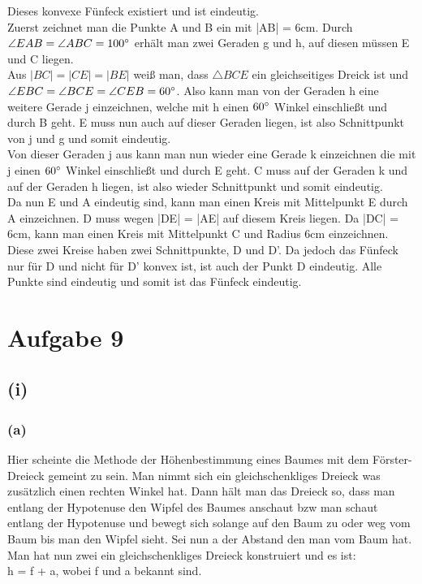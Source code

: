 \documentclass[12pt,a4paper]{article}
\begin{document}
\noindent Dieses konvexe Fünfeck existiert und ist eindeutig.\\
 Zuerst zeichnet man die Punkte A und B ein mit |AB| = 6cm. Durch $\angle EAB = \angle ABC = 100\degree$ erhält man zwei Geraden g und h, auf diesen müssen E und C liegen.\\
Aus $|BC| = |CE| = |BE|$ weiß man, dass $\triangle BCE$ ein gleichseitiges Dreick ist und $\angle EBC = \angle BCE = \angle CEB = 60\degree$. Also kann man von der Geraden h eine weitere Gerade j einzeichnen, welche mit h einen $60\degree$ Winkel einschließt und durch B geht. E muss nun auch auf dieser Geraden liegen, ist also Schnittpunkt von j und g und somit eindeutig. \\
Von dieser Geraden j aus kann man nun wieder eine Gerade k einzeichnen die mit j einen $60\degree$ Winkel einschließt und durch E geht. C muss auf der Geraden k und auf der Geraden h liegen, ist also wieder Schnittpunkt und somit eindeutig.\\
Da nun E und A eindeutig sind, kann man einen Kreis mit Mittelpunkt E durch A einzeichnen. D muss wegen |DE| = |AE| auf diesem Kreis liegen. Da |DC| = 6cm, kann man einen Kreis mit Mittelpunkt C und Radius 6cm einzeichnen. Diese zwei Kreise haben zwei Schnittpunkte, D und D'. Da jedoch das Fünfeck nur für D und nicht für D' konvex ist, ist auch der Punkt D eindeutig. Alle Punkte sind eindeutig und somit ist das Fünfeck eindeutig.\\

\newpage
\section*{Aufgabe 9}
\subsection*{(i)}
\subsubsection*{(a)}
Hier scheinte die Methode der Höhenbestimmung eines Baumes mit dem Förster-Dreieck gemeint zu sein. Man nimmt sich ein gleichschenkliges Dreieck was zusätzlich einen rechten Winkel hat. Dann hält man das Dreieck so, dass man entlang der Hypotenuse den Wipfel des Baumes anschaut bzw man schaut entlang der Hypotenuse und bewegt sich solange auf den Baum zu oder weg vom Baum bis man den Wipfel sieht. Sei nun a der Abstand den man vom Baum hat. Man hat nun zwei ein gleichschenkliges Dreieck konstruiert und es ist:\\
h = f + a, wobei f und a bekannt sind.
\end{document}

